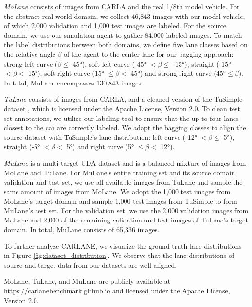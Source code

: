 \documentclass{article}
\begin{document}
	\vspace{-2pt}
	\textit{MoLane} consists of images from CARLA and the real 1/8th model vehicle. For the abstract real-world domain, we collect 46,843 images with our model vehicle, of which 2,000 validation and 1,000 test images are labeled. For the source domain, we use our simulation agent to gather 84,000 labeled images. To match the label distributions between both domains, we define five lane classes based on the relative angle $\beta$ of the agent to the center lane for our bagging approach: strong left curve ($\beta\leq$\ang{-45}), soft left curve (\ang{-45} $ < \beta \leq $ \ang{-15}), straight (\ang{-15} $ < \beta <$ \ang{15}), soft right curve (\ang{15} $ \leq \beta < $ \ang{45}) and strong right curve (\ang{45}$\leq \beta$). In total, MoLane encompasses 130,843 images. 
	
	\vspace{-2pt}
	\textit{TuLane} consists of images from CARLA, and a cleaned version of the TuSimple dataset \cite{TuSimple2017}, which is licensed under the Apache License, Version 2.0. To clean test set annotations, we utilize our labeling tool to ensure that the up to four lanes closest to the car are correctly labeled. We adapt the bagging classes to align the source dataset with TuSimple's lane distribution: left curve (\ang{-12} $ < \beta \leq$ \ang{5}), straight (\ang{-5} $ < \beta <$ \ang{5}) and right curve (\ang{5} $ \leq \beta < $ \ang{12}). 
	
	\vspace{-2pt}
	\textit{MuLane} is a multi-target UDA dataset and is a balanced mixture of images from MoLane and TuLane. For MuLane's entire training set and its source domain validation and test set, we use all available images from TuLane and sample the same amount of images from MoLane. We adopt the 1,000 test images from MoLane's target domain and sample 1,000 test images from TuSimple to form MuLane's test set. For the validation set, we use the 2,000 validation images from MoLane and 2,000 of the remaining validation and test images of TuLane's target domain. In total, MuLane consists of 65,336 images.
	
	To further analyze CARLANE, we visualize the ground truth lane distributions in Figure \ref{fig:dataset_distribution}. We observe that the lane distributions of source and target data from our datasets are well aligned. 
	
	MoLane, TuLane, and MuLane are publicly available at \href{https://carlanebenchmark.github.io}{https://carlanebenchmark.github.io} and licensed under the Apache License, Version 2.0.
	
\end{document}

